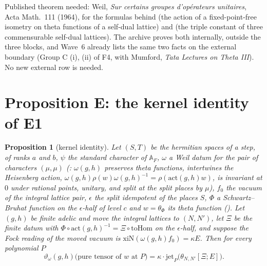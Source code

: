 \documentclass[11pt]{article}
\newtheorem{proposition}[theorem]{Proposition}
\theoremstyle{definition}
\theoremstyle{remark}
\begin{document}
\noindent Published theorem needed: Weil, \emph{Sur certains groupes d'op\'erateurs unitaires}, Acta Math.\ 111 (1964), for the formulas behind  (the action of a fixed-point-free isometry on theta functions of a self-dual lattice) and  (the triple constant of three commensurable self-dual lattices). The archive proves both internally, outside the three blocks, and Wave~6 already lists the same two facts on the external boundary (Group C (i), (ii) of F4, with Mumford, \emph{Tata Lectures on Theta III}). No new external row is needed.

\section{Proposition E: the kernel identity of E1}\label{sec:E}

\begin{proposition}[kernel identity]\label{prop:E}
Let $(S,T)$ be the hermitian spaces of a step, of ranks $a$ and $b$, $\psi$ the standard character of $\mathbb A_F$, $\omega$ a Weil datum for the pair of characters $(\mu,\mu)$ (: $\omega(g,h)$ preserves theta functions, intertwines the Heisenberg action, $\omega(g,h)\rho(w)\omega(g,h)^{-1}=\rho(\mathrm{act}(g,h)w)$, is invariant at $0$ under rational points, unitary, and split at the split places by $\mu$), $f_0$ the vacuum of the integral lattice pair, $\epsilon$ the split idempotent of the places $S$, $\Phi$ a Schwartz--Bruhat function on the $\epsilon$-half of level $c$ and $w=\theta_\Phi$ its theta function (). Let $(g,h)$ be finite adelic and move the integral lattices to $(N,N')$, let $\Xi$ be the finite datum with $\Phi\circ\mathrm{act}(g,h)^{-1}=\Xi\circ\mathrm{toHom}$ on the $\epsilon$-half, and suppose the Fock reading of the moved vacuum is $\mathrm{xiN}(\omega(g,h)f_0)=\kappa E$. Then for every polynomial $P$
\[
\vartheta_\omega(g,h)\bigl(\text{pure tensor of }w\text{ at }P\bigr)=\kappa\cdot\mathrm{jet}_P\bigl(\theta_{N,N'}[\Xi;E]\bigr).
\]
\end{proposition}
\end{document}

